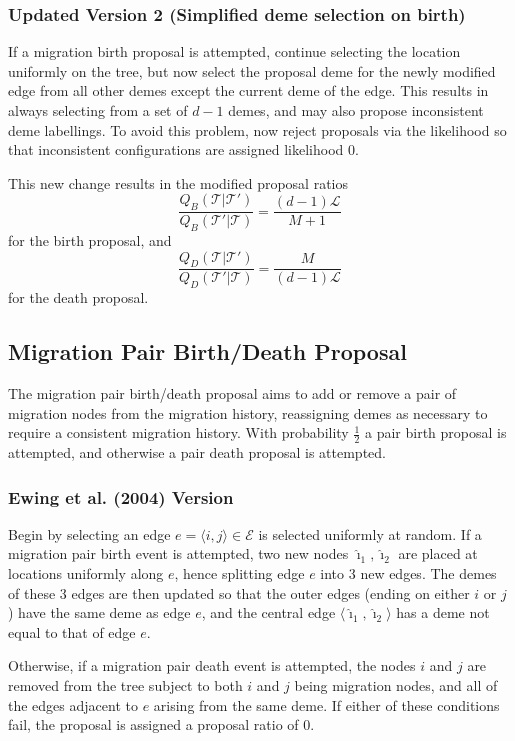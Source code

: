 \documentclass[12pt,a4paper]{article}
\newcommand{\calE}{\mathcal{E}}
\newcommand{\calL}{\mathcal{L}}
\newcommand{\calT}{\mathcal{T}}
\newcommand{\ihat}{\hat{\imath}}
\begin{document}
		\subsubsection{Updated Version 2 (Simplified deme selection on birth)}
			If a migration birth proposal is attempted, continue selecting the location uniformly on the tree, but now select the proposal deme for the newly modified edge from all other demes except the current deme of the edge. This results in always selecting from a set of $d-1$ demes, and may also propose inconsistent deme labellings. To avoid this problem, now reject proposals via the likelihood so that inconsistent configurations are assigned likelihood 0.
			
			This new change results in the modified proposal ratios
				\[
					\frac{Q_B (\calT | \calT')}{Q_B (\calT' | \calT)} = \frac{(d-1) \calL}{M+1}
				\]
			for the birth proposal, and
				\[
					\frac{Q_D (\calT | \calT')}{Q_D (\calT' | \calT)} = \frac{M}{(d-1)\calL}
				\]
			for the death proposal.
	
		\subsection{Migration Pair Birth/Death Proposal}
			The migration pair birth/death proposal aims to add or remove a pair of migration nodes from the migration history, reassigning demes as necessary to require a consistent migration history. With probability $\frac{1}{2}$ a pair birth proposal is attempted, and otherwise a pair death proposal is attempted.
			
			\subsubsection{Ewing et al. (2004) Version}
				Begin by selecting an edge $e = \langle i,j \rangle \in \calE$ is selected uniformly at random. If a migration pair birth event is attempted, two new nodes $\ihat_1, \ihat_2$ are placed at locations uniformly along $e$, hence splitting edge $e$ into 3 new edges. The demes of these 3 edges are then updated so that the outer edges (ending on either $i$ or $j$) have the same deme as edge $e$, and the central edge $\langle \ihat_1, \ihat_2 \rangle$ has a deme not equal to that of edge $e$.
				
				Otherwise, if a migration pair death event is attempted, the nodes $i$ and $j$ are removed from the tree subject to both $i$ and $j$ being migration nodes, and all of the edges adjacent to $e$ arising from the same deme. If either of these conditions fail, the proposal is assigned a proposal ratio of 0.
				
\end{document}
